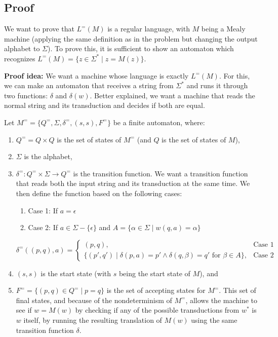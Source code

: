 \documentclass[12pt]{article}
\begin{document}
\subsection{Proof}

We want to prove that $L^= (M)$ is a regular language, with $M$ being a Mealy machine (applying the same definition as in the problem but changing the output alphabet to $\Sigma$). To prove this, it is sufficient to show an automaton which recognizes $L^= (M) = \{z \in \Sigma^* \mid z = M(z)\}$.

\textbf{Proof idea:} We want a machine whose language is exactly $L^= (M)$. For this, we can make an automaton that receives a string from $\Sigma^*$ and runs it through two functions: $\delta$ and $\delta(w)$. Better explained, we want a machine that reads the normal string and its transduction and decides if both are equal.

Let $M^= = \{Q^=, \Sigma, \delta^=, (s,s), F^=\}$ be a finite automaton, where:
\begin{enumerate}
    \item $Q^= = Q \times Q$ is the set of states of $M^=$ (and $Q$ is the set of states of $M$),
    \item $\Sigma$ is the alphabet,
    \item $\delta^= : Q^= \times \Sigma \rightarrow Q^=$ is the transition function. We want a transition function that reads both the input string and its transduction at the same time. We then define the function based on the following cases:
        \begin{enumerate}
            \item Case 1: If $a = \epsilon$
            \item Case 2: If $a \in \Sigma - \{\epsilon\}$ and $A = \{ \alpha \in \Sigma \mid w(q,a) = \alpha \} $
        \end{enumerate}
\[
\delta^=((p,q),a) =
\begin{cases}
    (p,q), & \text{Case 1} \\
    \{ (p',q') \mid \delta(p,a)=p' \land \delta(q,\beta)=q' \text{ for } \beta \in A \}, & \text{Case 2} 
\end{cases}
\]

    \item $(s,s)$ is the start state (with $s$ being the start state of $M$), and
    \item $F^= = \{(p,q) \in Q^= \mid p = q\}$ is the set of accepting states for $M^=$. This set of final states, and because of the nondeterminism of $M^=$, allows the machine to see if $w = M(w)$ by checking if any of the possible transductions from $w^*$ is $w$ itself, by running the resulting translation of $M(w)$ using the same transition function $\delta$.
\end{enumerate}
\end{document}
